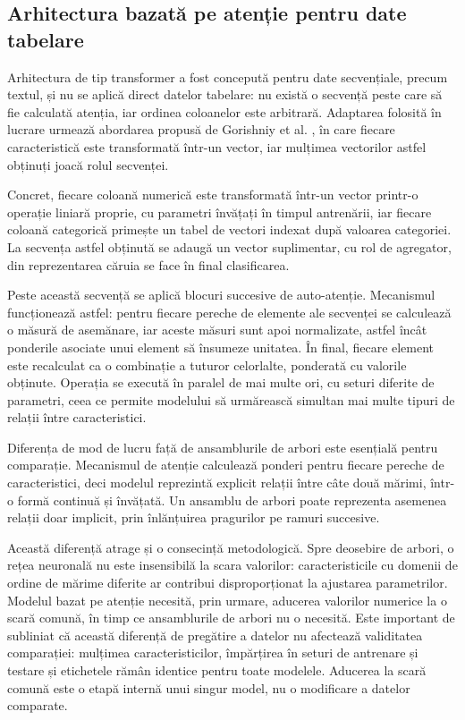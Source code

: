 \subsection{Arhitectura bazată pe atenție pentru date tabelare}\label{subsec:atentie}

Arhitectura de tip transformer \cite{vaswani2017attention} a fost concepută pentru date secvențiale, precum textul, și nu se aplică direct datelor tabelare: nu există o secvență peste care să fie calculată atenția, iar ordinea coloanelor este arbitrară. Adaptarea folosită în lucrare urmează abordarea propusă de Gorishniy et al. \cite{gorishniy2021revisiting}, în care fiecare caracteristică este transformată într-un vector, iar mulțimea vectorilor astfel obținuți joacă rolul secvenței.

Concret, fiecare coloană numerică este transformată într-un vector printr-o operație liniară proprie, cu parametri învățați în timpul antrenării, iar fiecare coloană categorică primește un tabel de vectori indexat după valoarea categoriei. La secvența astfel obținută se adaugă un vector suplimentar, cu rol de agregator, din reprezentarea căruia se face în final clasificarea.

Peste această secvență se aplică blocuri succesive de auto-atenție. Mecanismul funcționează astfel: pentru fiecare pereche de elemente ale secvenței se calculează o măsură de asemănare, iar aceste măsuri sunt apoi normalizate, astfel încât ponderile asociate unui element să însumeze unitatea. În final, fiecare element este recalculat ca o combinație a tuturor celorlalte, ponderată cu valorile obținute. Operația se execută în paralel de mai multe ori, cu seturi diferite de parametri, ceea ce permite modelului să urmărească simultan mai multe tipuri de relații între caracteristici.

Diferența de mod de lucru față de ansamblurile de arbori este esențială pentru comparație. Mecanismul de atenție calculează ponderi pentru fiecare pereche de caracteristici, deci modelul reprezintă explicit relații între câte două mărimi, într-o formă continuă și învățată. Un ansamblu de arbori poate reprezenta asemenea relații doar implicit, prin înlănțuirea pragurilor pe ramuri succesive.

Această diferență atrage și o consecință metodologică. Spre deosebire de arbori, o rețea neuronală nu este insensibilă la scara valorilor: caracteristicile cu domenii de ordine de mărime diferite ar contribui disproporționat la ajustarea parametrilor. Modelul bazat pe atenție necesită, prin urmare, aducerea valorilor numerice la o scară comună, în timp ce ansamblurile de arbori nu o necesită. Este important de subliniat că această diferență de pregătire a datelor nu afectează validitatea comparației: mulțimea caracteristicilor, împărțirea în seturi de antrenare și testare și etichetele rămân identice pentru toate modelele. Aducerea la scară comună este o etapă internă unui singur model, nu o modificare a datelor comparate.

